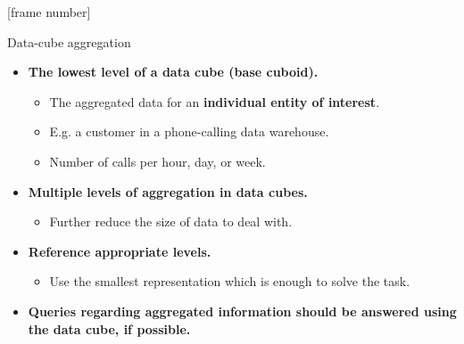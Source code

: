 \documentclass[aspectratio=169,t]{beamer}
\begin{document}
  {
    [frame number]
    \begin{frame}{Data-cube aggregation}
        \begin{itemize}
            \item \textbf{The lowest level of a data cube (base cuboid).}
            \begin{itemize}
              \item The aggregated data for an \textbf{individual entity of interest}.
              \item E.g. a customer in a phone-calling data warehouse.
              \item Number of calls per hour, day, or week.
            \end{itemize}
            \item \textbf{Multiple levels of aggregation in data cubes.}
            \begin{itemize}
              \item Further reduce the size of data to deal with.
            \end{itemize}
            \item \textbf{Reference appropriate levels.}
            \begin{itemize}
              \item Use the smallest representation which is enough to solve the task.
            \end{itemize}
            \item \textbf{Queries regarding aggregated information should be answered using the data cube, if possible.}
        \end{itemize}
    \end{frame}
  }
\end{document}
